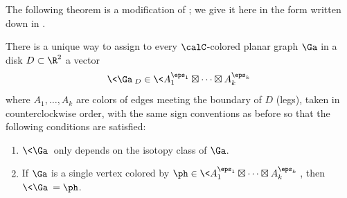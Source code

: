 The following theorem is a modification of ; we
give it here in the form written down in \cite{kirillov-stringnet}.
\begin{theorem}\label{t:evaluation-disk}
  There is a unique way to assign to every $\calC$-colored
  planar graph $\Ga$ in a disk $D\subset \R^2$ a vector
  \begin{equation}
    \<\Ga\>_D\in\<A_1^{\eps_1}\boxtimes\dots\boxtimes A_k^{\eps_k}\>
  \end{equation}
  where $A_1, \dots, A_k$ are colors of edges meeting the boundary
  of $D$ \textup{(}legs\textup{)}, taken in counterclockwise order, with the same sign
  conventions as before
  so that the following conditions are satisfied:
  \begin{enumerate}
     \item $\<\Ga\>$ only depends on the isotopy class of $\Ga$.

    \item If $\Ga$ is a single vertex colored by
          $\ph\in \<A_1^{\eps_1}\boxtimes\dots\boxtimes A_k^{\eps_k}\>$, then
          $\<\Ga\>=\ph$.


\end{enumerate}
\end{theorem}

